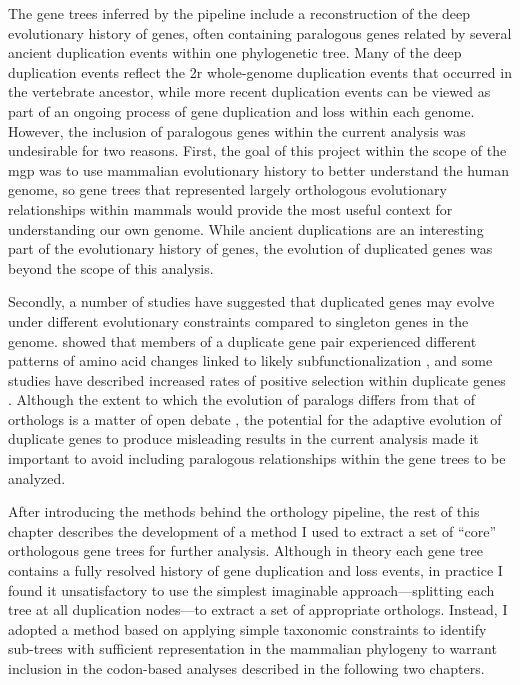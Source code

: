 The gene trees inferred by the \cmp pipeline include a reconstruction
of the deep evolutionary history of genes, often containing paralogous
genes related by several ancient duplication events within one
phylogenetic tree. Many of the deep duplication events reflect the
\ac{2r} whole-genome duplication events that occurred in the
vertebrate ancestor, while more recent duplication events can be
viewed as part of an ongoing process of gene duplication and loss
within each genome. However, the inclusion of paralogous genes within
the current analysis was undesirable for two reasons. First, the goal
of this project within the scope of the \ac{mgp} was to use mammalian
evolutionary history to better understand the human genome, so gene
trees that represented largely orthologous evolutionary relationships
within mammals would provide the most useful context for understanding
our own genome. While ancient duplications are an interesting part of
the evolutionary history of genes, the evolution of duplicated genes
was beyond the scope of this analysis.

Secondly, a number of studies have suggested that duplicated genes may
evolve under different evolutionary constraints compared to singleton
genes in the genome. \citet{Dermitzakis2001a} showed that members of a
duplicate gene pair experienced different patterns of amino acid
changes linked to likely subfunctionalization \citep{Massingham2001},
and some studies have described increased rates of positive selection
within duplicate genes
\citep{Lynch2000,Zhang2002,He2005,Hahn2009a}. Although the extent to
which the evolution of paralogs differs from that of orthologs is a
matter of open debate \citep{Nembaware2002,Jordan2004,Studer2009}, the
potential for the adaptive evolution of duplicate genes to produce
misleading results in the current analysis made it important to avoid
including paralogous relationships within the gene trees to be
analyzed.

After introducing the methods behind the \cmp orthology pipeline, the
rest of this chapter describes the development of a method I used to
extract a set of ``core'' orthologous gene trees for further
analysis. Although in theory each \cmp gene tree contains a fully
resolved history of gene duplication and loss events, in practice I
found it unsatisfactory to use the simplest imaginable
approach---splitting each tree at all duplication nodes---to extract a
set of appropriate orthologs. Instead, I adopted a method based on
applying simple taxonomic constraints to identify sub-trees with
sufficient representation in the mammalian phylogeny to warrant
inclusion in the codon-based analyses described in the following two
chapters.

